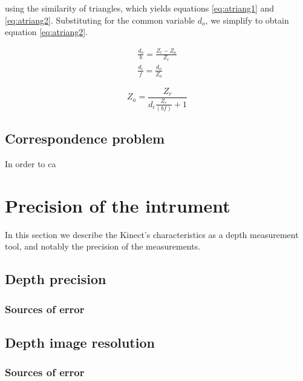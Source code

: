 using the similarity of triangles, which yields equations \ref{eq:atriang1} and
\ref{eq:atriang2}. Substituting for the common variable $d_o$, we simplify to
obtain equation \ref{eq:atriang2}.

\begin{align} 
    \frac{d_o}{b} = \frac{Z_r - Z_a}{Z_r} \label{eq:atriang1}\\
    \frac{d_i}{f} = \frac{d_o}{Z_a} \label{eq:atriang2}
\end{align}

\begin{equation} \label{eq:atriang2}
    Z_a = \frac{Z_r}{d_i \frac{Z_r}{(b f)} + 1}
\end{equation}

\subsection{Correspondence problem}
\label{sub:corr}

In order to ca






\section{Precision of the intrument}
\label{precision}

In this section we describe the Kinect's characteristics as a depth measurement
tool, and notably the precision of the measurements.


\subsection{Depth precision}

\subsubsection{Sources of error}

\subsection{Depth image resolution}

\subsubsection{Sources of error}
